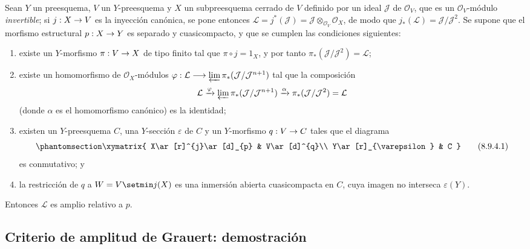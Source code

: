 \documentclass[oneside,10pt]{amsart}
\makeatletter
\newcommand{\ega@arrow}[2]{\mathchoice{#1}{#2}{#2}{#2}}
\renewcommand{\to}{\ega@arrow{\longrightarrow}{\rightarrow}}
\newcommand{\oldpage}[2][]{\marginnote{\normalfont\footnotesize\textbf{#1}~|~#2}\ignorespaces}
\let\EGAOriginalLabel\label
\renewcommand{\label}[1]{\phantomsection\EGAOriginalLabel{#1}}
\makeatother
\begin{document}
\begin{proposition}[8.9.4]
\label{II.8.9.4-fr}
Sean $Y$ un preesquema, $V$ un $Y$-preesquema y $X$ un subpreesquema cerrado de $V$ definido por un ideal $\mathcal{J}$ de $\mathcal{O}_V$, que es un $\mathcal{O}_V$-módulo \emph{invertible};
si $j:X\to V$ es
\oldpage[II]{184}
la inyección canónica, se pone entonces $\mathcal{L}=j^*(\mathcal{J})=
\mathcal{J}\otimes_{\mathcal{O}_V}\mathcal{O}_X$, de modo que $j_*(\mathcal{L})=\mathcal{J}/\mathcal{J}^2$.
Se supone que el morfismo estructural $p:X\to Y$ es separado y cuasicompacto, y que se cumplen las condiciones siguientes:
\begin{enumerate}
  \item[\rm{(i)}] existe un $Y$-morfismo $\pi:V\to X$ de tipo finito tal que $\pi\circ j=1_X$, y por tanto $\pi_*(\mathcal{J}/\mathcal{J}^2)=\mathcal{L}$;
  \item[\rm{(ii)}] existe un homomorfismo de $\mathcal{O}_X$-módulos $\varphi:\mathcal{L}\longrightarrow\varprojlim\pi_*(\mathcal{J}/\mathcal{J}^{n+1})$ tal que la composición
    \[
    \mathcal{L}\xrightarrow{\varphi}
    \varprojlim\pi_*(\mathcal{J}/\mathcal{J}^{n+1})
    \xrightarrow{\alpha}\pi_*(\mathcal{J}/\mathcal{J}^2)=\mathcal{L}
  \]
    (donde $\alpha$ es el homomorfismo canónico) es la identidad;
  \item[\rm{(iii)}] existen un $Y$-preesquema $C$, una $Y$-sección $\varepsilon$ de $C$ y un $Y$-morfismo $q:V\to C$ tales que el diagrama
    \begin{equation}
  \label{II.8.9.4.1-fr}
    \xymatrix{
      X\ar[r]^{j}\ar[d]_{p} & V\ar[d]^{q}\\
      Y\ar[r]_{\varepsilon} & C
    }
  \tag{8.9.4.1}
  \end{equation}
    es conmutativo; y
  \item[\rm{(iv)}] la restricción de $q$ a $W=V\setmin j(X)$ es una inmersión abierta cuasicompacta en $C$, cuya imagen no interseca $\varepsilon(Y)$.
\end{enumerate}
Entonces $\mathcal{L}$ es amplio relativo a $p$.
\end{proposition}


\subsection{Criterio de amplitud de Grauert: demostración}
\label{subsection:II.8.10-fr}
\end{document}
